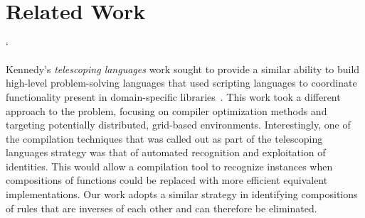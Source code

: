 
\section{Related Work}

% 
% 
% 
`%

Kennedy's \emph{telescoping languages} work sought to provide a
similar ability to build high-level problem-solving languages that
used scripting languages to coordinate functionality present in
domain-specific libraries~\cite{kennedy00telescoping}. This work took
a different approach to the problem, focusing on compiler optimization
methods and targeting potentially distributed, grid-based
environments. Interestingly, one of the compilation techniques that
was called out as part of the telescoping languages strategy was that
of automated recognition and exploitation of identities. This would
allow a compilation tool to recognize instances when compositions of
functions could be replaced with more efficient equivalent
implementations. Our work adopts a similar strategy in identifying
compositions of rules that are inverses of each other and can
therefore be eliminated.

